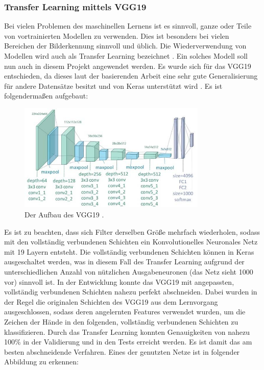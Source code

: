 \documentclass[11pt,bibliography=totocnumbered]{scrartcl}
\begin{document}
\subsubsection{Transfer Learning mittels VGG19}
Bei vielen Problemen des maschinellen Lernens ist es sinnvoll, ganze oder Teile von vortrainierten Modellen zu verwenden. Dies ist besonders bei vielen Bereichen der Bilderkennung sinnvoll und üblich. Die Wiederverwendung von Modellen wird auch als Transfer Learning bezeichnet \cite[S.287]{MACHINE_LEARNING}. Ein solches Modell soll nun auch in diesem Projekt angewendet werden. Es wurde sich für das VGG19 entschieden, da dieses laut der basierenden Arbeit eine sehr gute Generalisierung für andere Datensätze besitzt und von Keras unterstützt wird \cite{VGG19}. Es ist folgendermaßen aufgebaut:
\begin{figure}[H]
	\centering
	\includegraphics[width=0.80\textwidth]{vgg_19_img}
	\vspace*{-3mm}
	\caption[Aufbau des VGG19]{Der Aufbau des VGG19 \cite{VGG_19_IMG}.}
	\label{fig:vgg_19}
\end{figure}
\vspace*{-5mm}
Es ist zu beachten, dass sich Filter derselben Größe mehrfach wiederholen, sodass mit den vollständig verbundenen Schichten ein Konvolutionelles Neuronales Netz mit 19 Layern entsteht. Die vollständig verbundenen Schichten können in Keras ausgeschaltet werden, was in diesem Fall des Transfer Learning aufgrund der unterschiedlichen Anzahl von nützlichen Ausgabeneuronen (das Netz sieht 1000 vor) sinnvoll ist. In der Entwicklung konnte das VGG19 mit angepassten, vollständig verbundenen Schichten nahezu perfekt abschneiden. Dabei wurden in der Regel die originalen Schichten des VGG19 aus dem Lernvorgang ausgeschlossen, sodass deren angelernten Features verwendet wurden, um die Zeichen der Hände in den folgenden, vollständig verbundenen Schichten zu klassifizieren. Durch das Transfer Learning konnten Genauigkeiten von nahezu 100\% in der Validierung und in den Tests erreicht werden. Es ist damit das am besten abschneidende Verfahren. Eines der genutzten Netze ist in folgender Abbildung zu erkennen:
\end{document}
